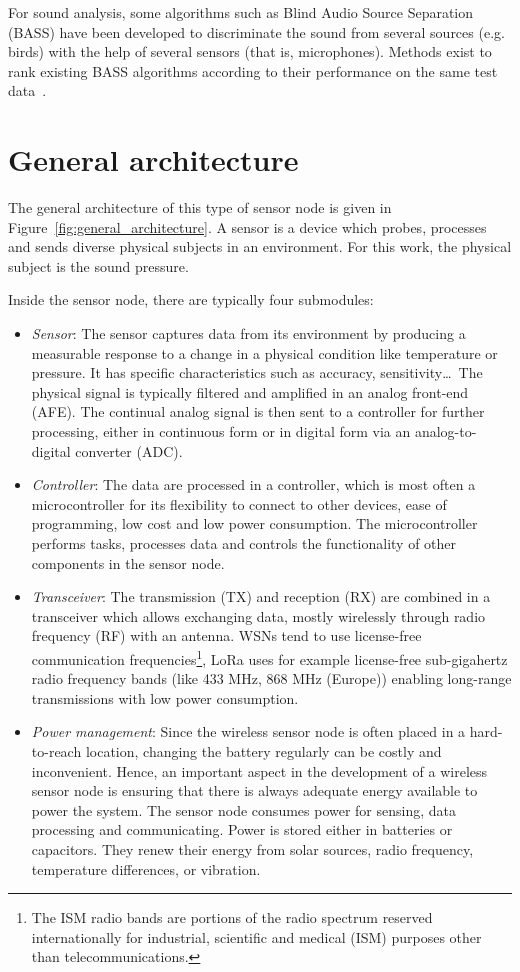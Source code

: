 \documentclass{EPL-master-thesis-covers-EN}
\begin{document}
For sound analysis, some algorithms such as Blind Audio Source Separation (BASS) have been developed to discriminate the sound from several sources (e.g. birds) with the help of several sensors (that is, microphones). Methods exist to rank existing BASS algorithms according to their performance on the same test data~\cite{Vincent2006}.

\section{General architecture}

The general architecture of this type of sensor node is given in Figure~\ref{fig:general_architecture}. A sensor is a device which probes, processes and sends diverse physical subjects in an environment. For this work, the physical subject is the sound pressure.

Inside the sensor node, there are typically four submodules:
\begin{itemize}
 \item \textit{Sensor}: The sensor captures data from its environment by producing a measurable response to a change in a physical condition like temperature or pressure. It has specific characteristics such as accuracy, sensitivity\dots ~The physical signal is typically filtered and amplified in an analog front-end (AFE). The continual analog signal is then sent to a controller for further processing, either in continuous form or in digital form via an analog-to-digital converter (ADC).
 \item \textit{Controller}: The data are processed in a controller, which is most often a microcontroller for its flexibility to connect to other devices, ease of programming, low cost and low power consumption. The microcontroller performs tasks, processes data and controls the functionality of other components in the sensor node.
 \item \textit{Transceiver}: The transmission (TX) and reception (RX) are combined in a transceiver which allows exchanging data, mostly wirelessly through radio frequency (RF) with an antenna. WSNs tend to use license-free communication frequencies\footnote{The ISM radio bands are portions of the radio spectrum reserved internationally for industrial, scientific and medical (ISM) purposes other than telecommunications.}, LoRa uses for example license-free sub-gigahertz radio frequency bands (like 433 MHz, 868 MHz (Europe)) enabling long-range transmissions with low power consumption.
 \item \textit{Power management}: Since the wireless sensor node is often placed in a hard-to-reach location, changing the battery regularly can be costly and inconvenient. Hence, an important aspect in the development of a wireless sensor node is ensuring that there is always adequate energy available to power the system. The sensor node consumes power for sensing, data processing and communicating. Power is stored either in batteries or capacitors. They renew their energy from solar sources, radio frequency, temperature differences, or vibration.
\end{itemize}
\end{document}
